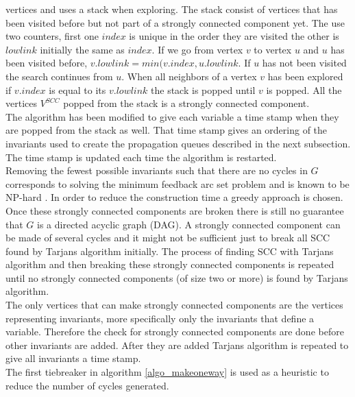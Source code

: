 vertices and uses a stack when exploring. The stack consist of vertices that has been visited before but not part of a 
strongly connected component yet. The use two counters, first one $index$ is unique in the order they are visited the 
other is $lowlink$ initially the same as $index$. If we go from vertex $v$ to vertex $u$ and $u$ has been visited 
before, $v.lowlink = min(v.index,u.lowlink$. If $u$ has not been visited the search continues from $u$. When all 
neighbors of a vertex $v$ has been explored if $v.index$ is equal to its $v.lowlink$ the stack is popped until $v$ is 
popped. All the vertices $V^{SCC}$ popped from the stack is a strongly connected component. \\
The algorithm has been modified to give each variable a time stamp when they are popped from the stack as well. That 
time stamp gives an ordering of the invariants used to create the propagation queues described in the next subsection. 
The time stamp is updated each time the algorithm is restarted. \\
Removing the fewest possible invariants such that there are no cycles in $G$ corresponds to solving the minimum 
feedback arc set problem and is known to be NP-hard \cite[p.9]{oscar}. In order to reduce the construction time a 
greedy approach is chosen. \\
Once these strongly connected components are broken there is still no guarantee that $G$ is a directed acyclic graph 
(DAG). A strongly connected component can be made of several cycles and it might not be sufficient just to break all 
SCC found by Tarjans algorithm initially. The process of finding SCC with Tarjans algorithm and then 
breaking these strongly connected components is repeated until no strongly connected components (of size two or more) 
is found by Tarjans algorithm. \medskip \\  
The only vertices that can make strongly connected components are the vertices representing invariants, more 
specifically only the invariants that define a variable. Therefore the check for strongly connected components are done 
before other invariants are added. After they are added Tarjans algorithm is repeated to give all invariants a 
time stamp. \\ 
The first tiebreaker in algorithm \ref{algo_makeoneway} is used as a heuristic to reduce the number of cycles 
generated.  \\





